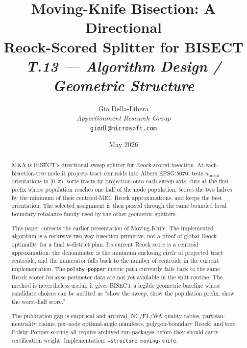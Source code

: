 \documentclass[12pt]{article}
\title{%
  \textbf{Moving-Knife Bisection: A Directional}\\
  \textbf{Reock-Scored Splitter for BISECT}\\[0.8em]
  \normalsize\textit{T.13 --- Algorithm Design / Geometric Structure}%
}
\author{%
  Gio Della-Libera\\
  \textit{Apportionment Research Group}\\
  \small\texttt{giodl@microsoft.com}
}
\date{May 2026}
\newcommand{\mka}{\textsc{MKA}}
\begin{document}
\maketitle

\begin{abstract}
\noindent
\mka{} is BISECT's directional sweep splitter for Reock-scored bisection.
At each bisection-tree node it projects tract centroids into Albers EPSG:5070,
tests $n_{\mathrm{orient}}$ orientations in $[0,\pi)$, sorts tracts by
projection onto each sweep axis, cuts at the first prefix whose population
reaches one half of the node population, scores the two halves by the minimum
of their centroid-MEC Reock approximations, and keeps the best orientation.
The selected assignment is then passed through the same bounded local boundary
rebalance family used by the other geometric splitters.

This paper corrects the earlier presentation of Moving-Knife. The implemented
algorithm is a recursive two-way bisection primitive, not a proof of global
Reock optimality for a final $k$-district plan. Its current Reock score is a
centroid approximation: the denominator is the minimum enclosing circle of
projected tract centroids, and the numerator falls back to the number of
centroids in the current implementation. The \texttt{polsby-popper} metric path
currently falls back to the same Reock scorer because perimeter data are not
yet available in the split routine. The method is nevertheless useful: it gives
BISECT a legible geometric baseline whose candidate choices can be audited as
``show the sweep, show the population prefix, show the worst-half score.''

The publication gap is empirical and archival. NC/FL/WA quality tables,
partisan-neutrality claims, per-node optimal-angle manifests, polygon-boundary
Reock, and true Polsby-Popper scoring all require archived run packages before
they should carry certification weight. Implementation:
\texttt{--structure moving-knife}.
\end{abstract}

\tableofcontents
\newpage










\end{document}
